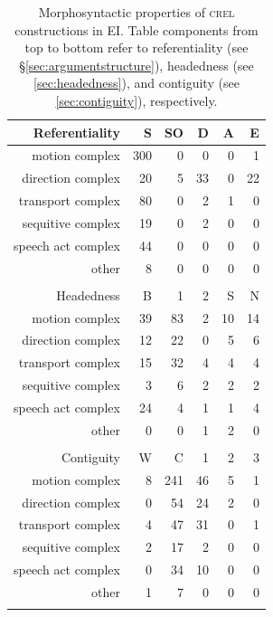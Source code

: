 \begin{table}
\centering
\begin{tabular}{rrrrrr}
  \lsptoprule
Referentiality & S & SO & D & A & E \\ 
  \hline
motion complex & 300 &   0 &   0 &   0 &   1 \\ 
  direction complex &  20 &   5 &  33 &   0 &  22 \\ 
  transport complex &  80 &   0 &   2 &   1 &   0 \\ 
  sequitive complex &  19 &   0 &   2 &   0 &   0 \\ 
  speech act complex &  44 &   0 &   0 &   0 &   0 \\ 
  other &   8 &   0 &   0 &   0 &   0 \\ 
   \hline
 \\
  \hline
Headedness & B & 1 & 2 & S & N \\ 
  \hline
motion complex &  39 &  83 &   2 &  10 &  14 \\ 
  direction complex &  12 &  22 &   0 &   5 &   6 \\ 
  transport complex &  15 &  32 &   4 &   4 &   4 \\ 
  sequitive complex &   3 &   6 &   2 &   2 &   2 \\ 
  speech act complex &  24 &   4 &   1 &   1 &   4 \\ 
  other &   0 &   0 &   1 &   2 &   0 \\ 
   \hline
 \\
  \hline
Contiguity & W & C & 1 & 2 & 3 \\ 
  \hline
motion complex &   8 & 241 &  46 &   5 &   1 \\ 
  direction complex &   0 &  54 &  24 &   2 &   0 \\ 
  transport complex &   4 &  47 &  31 &   0 &   1 \\ 
  sequitive complex &   2 &  17 &   2 &   0 &   0 \\ 
  speech act complex &   0 &  34 &  10 &   0 &   0 \\ 
  other &   1 &   7 &   0 &   0 &   0 \\ 
   \lspbottomrule
\end{tabular}
\caption[Morphosyntactic properties of \textsc{crel} constructions]{Morphosyntactic properties of \textsc{crel} constructions in EI. Table components from top to bottom refer to referentiality (see §\ref{sec:argumentstructure}), headedness (see \ref{sec:headedness}), and contiguity (see \ref{sec:contiguity}), respectively.}
\label{table:crel_formal}
\end{table}

